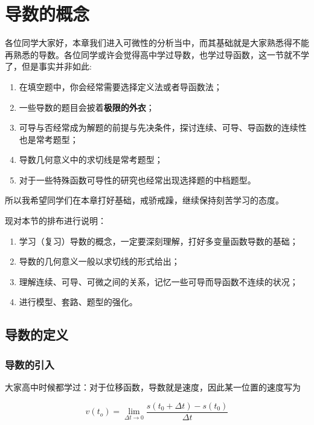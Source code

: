 \chapter{导数的概念}\label{ch:2.1}

各位同学大家好，本章我们进入可微性的分析当中，而其基础就是大家熟悉得不能再熟悉的导数。各位同学或许会觉得高中学过导数，也学过导函数，这一节就不学了，但是事实并非如此:
\begin{enumerate}
	\item 在填空题中，你会经常需要选择定义法或者导函数法；
	\item 一些导数的题目会披着\textbf{极限的外衣}；
	\item 可导与否经常成为解题的前提与先决条件，探讨连续、可导、导函数的连续性也是常考题型；
	\item 导数几何意义中的求切线是常考题型；
	\item 对于一些特殊函数可导性的研究也经常出现选择题的中档题型。
\end{enumerate}

所以我希望同学们在本章打好基础，戒骄戒躁，继续保持刻苦学习的态度。

现对本节的排布进行说明：

\begin{enumerate}
	\item 学习（复习）导数的概念，一定要深刻理解，打好多变量函数导数的基础；
	\item 导数的几何意义一般以求切线的形式给出；
	\item 理解连续、可导、可微之间的关系，记忆一些可导而导函数不连续的状况；
	\item 进行模型、套路、题型的强化。
\end{enumerate}

\section{导数的定义}\label{sec:1.1}

\subsection{导数的引入}\label{sec:1.1.1}

大家高中时候都学过：对于位移函数，导数就是速度，因此某一位置的速度写为

\begin{equation*}
	v(t_o)=\underset{\Delta t\rightarrow 0}{\lim}\frac{s(t_0+\Delta t)-s(t_0)}{\Delta t}
\end{equation*}

